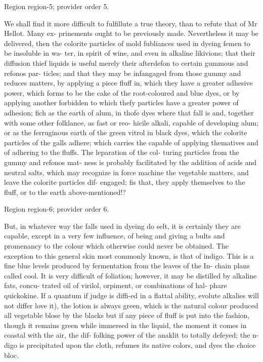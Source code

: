 \documentclass[11pt]{article}
\begin{document}
{\scriptsize\color{gray} Region region-5; provider order 5.\par}
\medskip

We shall find it more difficult to fulfillute a true theory, than to refute that of Mr Hellot. Many ex- prinements ought to be previously made. Nevertheless
it may be delivered, then the colorite particles of mold
fubliances used in dyeing femen to be insoluble in wa- ter, in spirit of wine, and even in alkaline likivions; that their diffusion thief liquids is useful merely
their afterdefon to certain gummous and refonos par- ticles; and that they may be infangaged from those
gummy and reduces matters, by applying a piece
fluff in, which they have a greater adhesive power,
which forms to be the cake of the root-coloured and
blue dyes, or by applying another forbidden to which
thefy particles have a greater power of adhesion; fich
as the earth of alum, in thofe dyes where that fall is
and, together with some other folklance, as fast or reo-
hicile alkali, capable of developing alum; or as the ferruginous earth of the green vitrol in black dyes,
which the colorite particles of the galls adhere;
which carries the capable of applying thematives and
of adhering to the fluffs. The leparation of the col-
turing particles from the gummy and refonos mat-
ness is probably facilitated by the addition of acids and
neutral salts, which may recognize in force machine the vegetable matters, and leave the colorite particles dif-
engaged; fis that, they apply themselves to the
fluff, or to the earth above-mentioned!?
\par

{\scriptsize\color{gray} Region region-6; provider order 6.\par}
\medskip

But, in whatever way the falls used in dyeing do
selt, it is certainly they are capable, except in a very few
influence, of being and giving a bults and promenancy
to the colour which otherwise could never be obtained.
The exception to this general skin most commonly
known, is that of indigo. This is a fine blue levels produced by fermentation from the leaves of the In-
chain plans called cool. It is very difficult of foliation;
however, it may be distilled by alkaline fats, concu- trated oil of virilol, orpiment, or combinations of hal-
phare quickokine. If a quantum if judge is diffi-ed in a flattal ability, evolute alkalies will not differ
love it), the lotion is always green, which is the
natural colour produced all vegetable blose by the
blacks but if any piece of fluff is put into the fashion,
though it remains green while immersed in the liquid,
the moment it comes in coastal with the air, the dif-
folking power of the anaklit to totally defeyed; the n-
digo is precipitated upon the cloth, refumes its native
colors, and dyes the choice bloc.
\par
\end{document}
